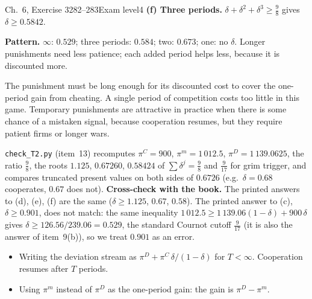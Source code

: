 \begin{exsol}{\MG{} Ch.~6, Exercise 3}{282--283}{Exam level}{4}
\textbf{(f) Three periods.} $\delta + \delta^2 + \delta^3 \ge \frac98$ gives $\delta \ge 0.5842$.

\textbf{Pattern.} $\infty$: $0.529$; three periods: $0.584$; two: $0.673$; one: no $\delta$. Longer punishments
need less patience; each added period helps less, because it is discounted more.

\interp The punishment must be long enough for its discounted cost to cover the one-period gain from cheating.
A single period of competition costs too little in this game. Temporary punishments are attractive in practice
when there is some chance of a mistaken signal, because cooperation resumes, but they require patient firms
or longer wars.

\verify \texttt{check\_T2.py} (item~13) recomputes $\pi^C = 900$, $\pi^m = 1\,012.5$, $\pi^D = 1\,139.0625$, the ratio
$\frac98$, the roots $1.125$, $0.67260$, $0.58424$ of $\sum\delta^j = \frac98$ and $\frac9{17}$ for grim trigger, and
compares truncated present values on both sides of $0.6726$ (e.g.\ $\delta = 0.68$ cooperates, $0.67$ does not).
\textbf{Cross-check with the book.} The printed answers to (d), (e), (f) are the same ($\delta \ge 1.125$,
$0.67$, $0.58$). The printed answer to (c), $\delta \ge 0.901$, does not match: the same inequality
$1\,012.5 \ge 1\,139.06(1-\delta) + 900\,\delta$ gives $\delta \ge 126.56/239.06 = 0.529$, the standard
Cournot cutoff $\frac9{17}$ (it is also the answer of item~9(b)), so we treat $0.901$ as an error.

\mistakes
\begin{itemize}
  \item Writing the deviation stream as $\pi^D + \pi^C\,\delta/(1-\delta)$ for $T < \infty$. Cooperation resumes
  after $T$ periods.
  \item Using $\pi^m$ instead of $\pi^D$ as the one-period gain: the gain is $\pi^D - \pi^m$.
\end{itemize}

\end{exsol}
